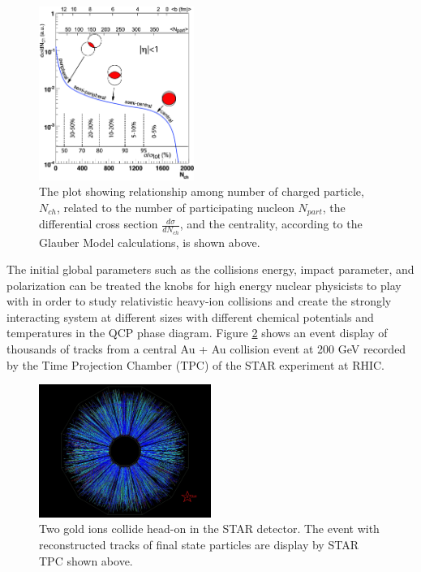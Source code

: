 \begin{figure}[hbtp]
\begin{center}
\includegraphics[width=0.45\textwidth]{Figures/Chapter1/CentDefPlot.png}
\caption{The plot showing relationship among number of charged particle, $N_{ch}$, related to the number of participating nucleon $N_{part}$, the differential cross section $\frac{d\sigma}{dN_{ch}}$, and the centrality, according to the Glauber Model calculations, is shown above.}
\label{CentDefPlot}
\end{center}
\end{figure} 


The initial global parameters such as the collisions energy, impact parameter, and polarization can be treated the knobs for high energy nuclear physicists to play with in order to study relativistic heavy-ion collisions and create the strongly interacting system at different sizes with different chemical potentials and temperatures in the QCP phase diagram. Figure \ref{STAREvtDisplay} shows an event display of thousands of tracks from a central Au + Au collision event at 200 GeV recorded by the Time Projection Chamber (TPC) of the STAR experiment at RHIC.


\begin{figure}[hbtp]
\begin{center}
\includegraphics[width=0.50\textwidth]{Figures/Chapter1/STAREvtDisplay.png}
\caption{Two gold ions collide head-on in the STAR detector. The event with reconstructed tracks of final state particles are display by STAR TPC shown above.}
\label{STAREvtDisplay}
\end{center}
\end{figure} 



